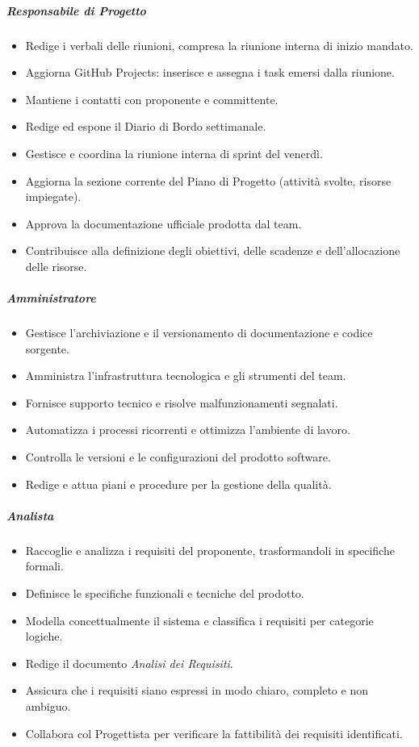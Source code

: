 \documentclass[a4paper, 11pt, oneside]{scrartcl}
\begin{document}
\subparagraph{Responsabile di Progetto}
\begin{itemize}
    \item Redige i verbali delle riunioni, compresa la riunione interna di inizio mandato.
    \item Aggiorna GitHub Projects: inserisce e assegna i task emersi dalla riunione.
    \item Mantiene i contatti con proponente e committente.
    \item Redige ed espone il Diario di Bordo settimanale.
    \item Gestisce e coordina la riunione interna di sprint del venerdì.
    \item Aggiorna la sezione corrente del Piano di Progetto (attività svolte, risorse impiegate).
    \item Approva la documentazione ufficiale prodotta dal team.
    \item Contribuisce alla definizione degli obiettivi, delle scadenze e dell'allocazione delle risorse.
\end{itemize}

\subparagraph{Amministratore}
\begin{itemize}
    \item Gestisce l'archiviazione e il versionamento di documentazione e codice sorgente.
    \item Amministra l'infrastruttura tecnologica e gli strumenti del team.
    \item Fornisce supporto tecnico e risolve malfunzionamenti segnalati.
    \item Automatizza i processi ricorrenti e ottimizza l'ambiente di lavoro.
    \item Controlla le versioni e le configurazioni del prodotto software.
    \item Redige e attua piani e procedure per la gestione della qualità.
\end{itemize}

\subparagraph{Analista}
\begin{itemize}
    \item Raccoglie e analizza i requisiti del proponente, trasformandoli in specifiche formali.
    \item Definisce le specifiche funzionali{\scriptsize{}} e tecniche{\scriptsize{}} del prodotto.
    \item Modella concettualmente il sistema e classifica i requisiti per categorie logiche.
    \item Redige il documento \emph{Analisi dei Requisiti}{\scriptsize{}}.
    \item Assicura che i requisiti siano espressi in modo chiaro, completo e non ambiguo.
    \item Collabora col Progettista per verificare la fattibilità dei requisiti identificati.
\end{itemize}
\end{document}
